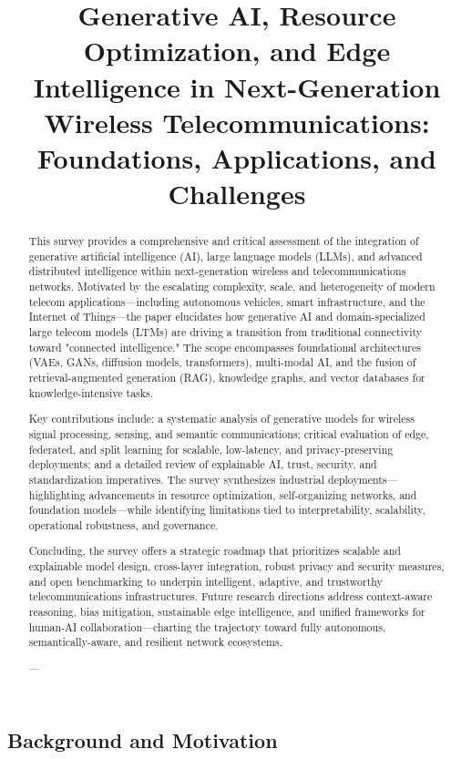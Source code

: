 \documentclass[sigconf]{acmart}
\title{Generative AI, Resource Optimization, and Edge Intelligence in Next-Generation Wireless Telecommunications: Foundations, Applications, and Challenges}
\begin{document}
\begin{abstract}
This survey provides a comprehensive and critical assessment of the integration of generative artificial intelligence (AI), large language models (LLMs), and advanced distributed intelligence within next-generation wireless and telecommunications networks. Motivated by the escalating complexity, scale, and heterogeneity of modern telecom applications—including autonomous vehicles, smart infrastructure, and the Internet of Things—the paper elucidates how generative AI and domain-specialized large telecom models (LTMs) are driving a transition from traditional connectivity toward "connected intelligence." The scope encompasses foundational architectures (VAEs, GANs, diffusion models, transformers), multi-modal AI, and the fusion of retrieval-augmented generation (RAG), knowledge graphs, and vector databases for knowledge-intensive tasks.

Key contributions include: a systematic analysis of generative models for wireless signal processing, sensing, and semantic communications; critical evaluation of edge, federated, and split learning for scalable, low-latency, and privacy-preserving deployments; and a detailed review of explainable AI, trust, security, and standardization imperatives. The survey synthesizes industrial deployments—highlighting advancements in resource optimization, self-organizing networks, and foundation models—while identifying limitations tied to interpretability, scalability, operational robustness, and governance.

Concluding, the survey offers a strategic roadmap that prioritizes scalable and explainable model design, cross-layer integration, robust privacy and security measures, and open benchmarking to underpin intelligent, adaptive, and trustworthy telecommunications infrastructures. Future research directions address context-aware reasoning, bias mitigation, sustainable edge intelligence, and unified frameworks for human-AI collaboration—charting the trajectory toward fully autonomous, semantically-aware, and resilient network ecosystems.

---
\end{abstract}

\maketitle

\subsection{Background and Motivation}
\end{document}

